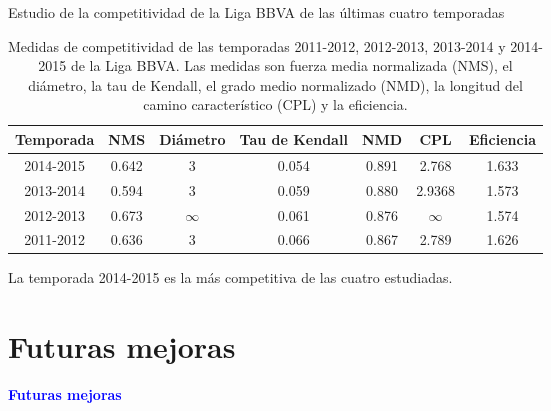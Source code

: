 \documentclass[10pt,hyperref={unicode}]{beamer}
\begin{document}
	\begin{frame}{Estudio de la competitividad de la Liga BBVA de las últimas cuatro temporadas}	

		\begin{table}[h]
			\centering
			\caption[Medidas de competitividad de las últimas cuatro temporadas]{Medidas de competitividad de las temporadas 2011-2012, 2012-2013, 2013-2014 y 2014-2015 de la Liga BBVA. Las medidas son fuerza media normalizada (NMS), el diámetro, la tau de Kendall, el grado medio normalizado (NMD), la longitud del camino característico (CPL) y la eficiencia.}
			\label{tbl:medidas}
			\begin{adjustbox}{max width=\textwidth}
			\begin{tabular}{@{}ccccccc@{}}
				\toprule
				Temporada & NMS & Diámetro & Tau de Kendall & NMD & CPL & Eficiencia \\ \midrule
				2014-2015 & 0.642                    & 3        & 0.054          & 0.891                   & 2.768                              & 1.633      \\
				2013-2014 & 0.594                    & 3        & 0.059          & 0.880                   & 2.9368                             & 1.573      \\
				2012-2013 & 0.673                    & $\infty$ & 0.061          & 0.876                   & $\infty$                           & 1.574      \\
				2011-2012 & 0.636                    & 3        & 0.066          & 0.867                   & 2.789                              & 1.626      \\ \bottomrule
			\end{tabular}
			\end{adjustbox}
		\end{table}
		
		La temporada 2014-2015 es la más competitiva de las cuatro estudiadas.
		
	\end{frame}
	
	\section{Futuras mejoras}
	
	\begin{frame}
		\begin{center}
			\Huge\textbf{\textsf{\textcolor{blue}{Futuras mejoras}}}
		\end{center}
	\end{frame}	
	
\end{document}
